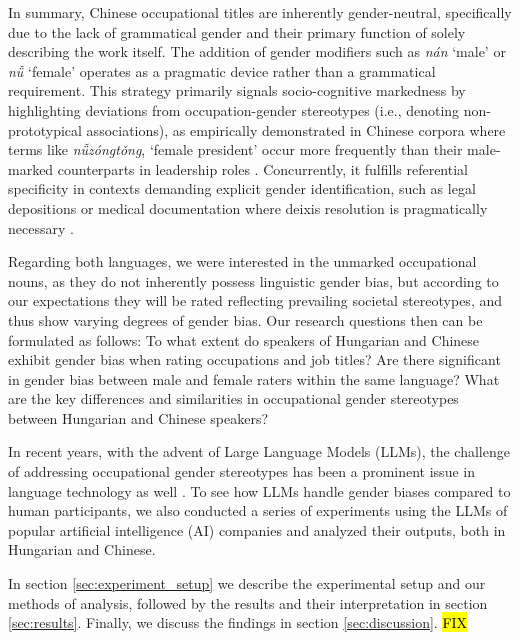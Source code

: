 \documentclass[11pt]{article}
\newcommand{\zh}[1]{\simplifiedchinesefont{#1}\rmfamily}
\begin{document}
In summary, Chinese occupational titles are inherently gender-neutral, specifically due to the lack of grammatical gender and their primary function of solely describing the work itself. The addition of gender modifiers such as \zh{男} \textit{nán} `male' or \zh{女} \textit{nǚ} `female' operates as a pragmatic device rather than a grammatical requirement. This strategy primarily signals socio-cognitive markedness by highlighting deviations from occupation-gender stereotypes (i.e., denoting non-prototypical associations), as empirically demonstrated in Chinese corpora where terms like \zh{女总统} \textit{nǚzóngtǒng}, `female president' occur more frequently than their male-marked counterparts in leadership roles \citep{su_2021_occupational,farris_1988_gender}. Concurrently, it fulfills referential specificity in contexts demanding explicit gender identification, such as legal depositions or medical documentation where deixis resolution is pragmatically necessary \citep{hellinger_2003_gender,stahlberg_2011_representation}.


Regarding both languages, we were interested in the unmarked occupational nouns, as they do not inherently possess linguistic gender bias, but according to our expectations they will be rated reflecting prevailing societal stereotypes, and thus show varying degrees of gender bias. Our research questions then can be formulated as follows: To what extent do speakers of Hungarian and Chinese exhibit gender bias when rating occupations and job titles? Are there significant in gender bias between male and female raters within the same language? What are the key differences and similarities in occupational gender stereotypes between Hungarian and Chinese speakers? 

In recent years, with the advent of Large Language Models (LLMs), the challenge of addressing occupational gender stereotypes has been a prominent issue in language technology as well \citep[cf.][]{kirk_2021_bias,ju_2024_female,an_2025_mutual}. To see how LLMs handle gender biases compared to human participants, we also conducted a series of experiments using the LLMs of popular artificial intelligence (AI) companies and analyzed their outputs, both in Hungarian and Chinese.

In section \ref{sec:experiment_setup} we describe the experimental setup and our methods of analysis, followed by the results and their interpretation in section \ref{sec:results}. Finally, we discuss the findings in section \ref{sec:discussion}. \hl{FIX}
\end{document}
